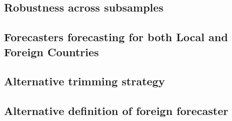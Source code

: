 
\subsection{Robustness across subsamples}

\subsection{Forecasters forecasting for both Local and Foreign Countries}

\subsection{Alternative trimming strategy}

\subsection{Alternative definition of foreign forecaster}


